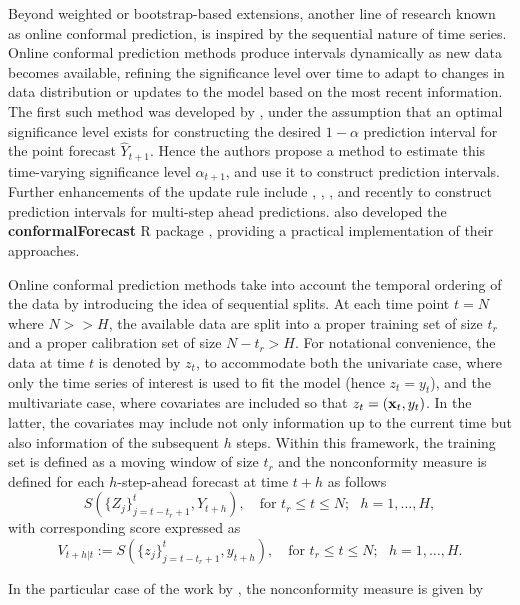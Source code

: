 Beyond weighted or bootstrap-based extensions, another line of research
known as online conformal prediction, is inspired by the sequential
nature of time series. Online conformal prediction methods produce
intervals dynamically as new data becomes available, refining the
significance level over time to adapt to changes in data distribution or
updates to the model based on the most recent information. The first
such method was developed by \citet{Gibbs_Candes_2021}, under the assumption that an
optimal significance level exists for constructing the desired
\(1-\alpha\) prediction interval for the point forecast \(\hat Y_{t+1}\).
Hence the authors propose a method to estimate this time-varying
significance level \(\alpha_{t+1}\), and use it to construct prediction
intervals. Further enhancements of the update rule include \citet{zaffran2022},
\citet{Bhatnagar_Wang_Xiong_Bai_2023}, \citet{angelopoulos2023}, and recently \citet{Wang_Hyndman_2024} to
construct prediction intervals for multi-step ahead predictions.
\citet{Wang_Hyndman_2024} also developed the \textbf{conformalForecast} R package
\citep{conformalForecast}, providing a practical implementation of their
approaches.

Online conformal prediction methods take into account the temporal
ordering of the data by introducing the idea of sequential splits. At
each time point \(t=N\) where \(N >> H\), the available data are split into
a proper training set of size \(t_r\) and a proper calibration set of size
\(N-t_r>H\). For notational convenience, the data at time \(t\) is denoted
by \(z_t\), to accommodate both the univariate case, where only the time
series of interest is used to fit the model (hence \(z_t = y_t\)), and the
multivariate case, where covariates are included so that
\(z_t = (\textbf x_t, y_t)\). In the latter, the covariates may include
not only information up to the current time but also information of the
subsequent \(h\) steps. Within this framework, the training set is defined
as a moving window of size \(t_r\) and the nonconformity measure is
defined for each \(h\)-step-ahead forecast at time \(t+h\) as follows \[
S(\{Z_j\}_{j=t-t_r + 1}^{t}, Y_{t+h}), \quad \text{for } t_r\leq t \leq N; \text{ } h=1,\ldots,H,
\] with corresponding score expressed as \[
V_{t+h\lvert t} := S(\{z_j\}_{j=t-t_r + 1}^{t}, y_{t+h}), \quad \text{for } t_r\leq t \leq N; \text{ } h=1,\ldots,H.
\]

In the particular case of the work by \citet{Wang_Hyndman_2024}, the
nonconformity measure is given by

